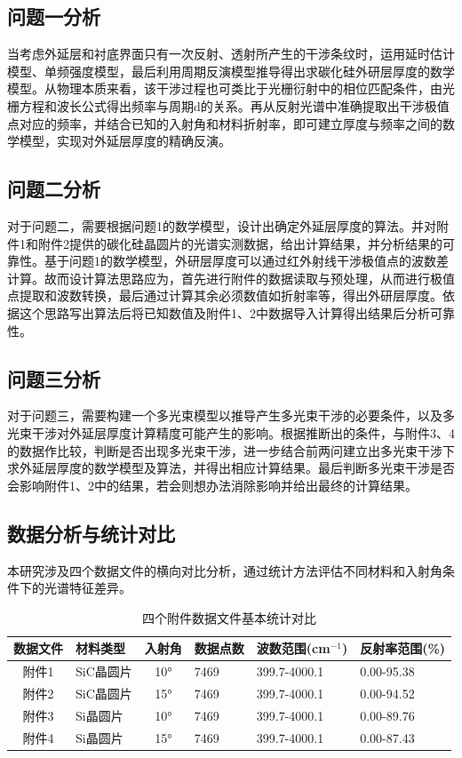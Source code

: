 \documentclass[withoutpreface,bwprint]{cumcmthesis}
\begin{document}
\subsection{问题一分析}
当考虑外延层和衬底界面只有一次反射、透射所产生的干涉条纹时，运用延时估计模型、单频强度模型，最后利用周期反演模型推导得出求碳化硅外研层厚度的数学模型。从物理本质来看，该干涉过程也可类比于光栅衍射中的相位匹配条件，由光栅方程和波长公式得出频率与周期d的关系。再从反射光谱中准确提取出干涉极值点对应的频率，并结合已知的入射角和材料折射率，即可建立厚度与频率之间的数学模型，实现对外延层厚度的精确反演。
\subsection{问题二分析}	
对于问题二，需要根据问题1的数学模型，设计出确定外延层厚度的算法。并对附件1和附件2提供的碳化硅晶圆片的光谱实测数据，给出计算结果，并分析结果的可靠性。基于问题1的数学模型，外研层厚度可以通过红外射线干涉极值点的波数差计算。故而设计算法思路应为，首先进行附件的数据读取与预处理，从而进行极值点提取和波数转换，最后通过计算其余必须数值如折射率等，得出外研层厚度。依据这个思路写出算法后将已知数值及附件1、2中数据导入计算得出结果后分析可靠性。
\subsection{问题三分析}
对于问题三，需要构建一个多光束模型以推导产生多光束干涉的必要条件，以及多光束干涉对外延层厚度计算精度可能产生的影响。根据推断出的条件，与附件3、4的数据作比较，判断是否出现多光束干涉，进一步结合前两问建立出多光束干涉下求外延层厚度的数学模型及算法，并得出相应计算结果。最后判断多光束干涉是否会影响附件1、2中的结果，若会则想办法消除影响并给出最终的计算结果。

\subsection{数据分析与统计对比}

本研究涉及四个数据文件的横向对比分析，通过统计方法评估不同材料和入射角条件下的光谱特征差异。

\begin{table}[H]
\centering
\caption{四个附件数据文件基本统计对比}
\begin{tabularx}{\textwidth}{CLC}
\toprule
数据文件 & 材料类型 & 入射角 & 数据点数 & 波数范围(cm$^{-1}$) & 反射率范围(\%) \\
\midrule
附件1 & SiC晶圆片 & 10° & 7469 & 399.7-4000.1 & 0.00-95.38 \\
附件2 & SiC晶圆片 & 15° & 7469 & 399.7-4000.1 & 0.00-94.52 \\
附件3 & Si晶圆片 & 10° & 7469 & 399.7-4000.1 & 0.00-89.76 \\
附件4 & Si晶圆片 & 15° & 7469 & 399.7-4000.1 & 0.00-87.43 \\
\bottomrule
\end{tabularx}
\label{tab:数据统计对比}
\end{table}
\end{document}
